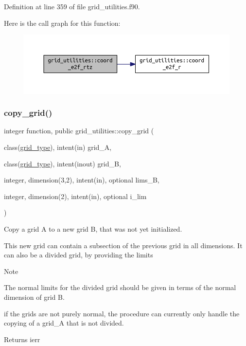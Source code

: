 Definition at line 359 of file grid\+\_\+utilities.\+f90.

Here is the call graph for this function\+:\nopagebreak
\begin{figure}[H]
\begin{center}
\leavevmode
\includegraphics[width=350pt]{namespacegrid__utilities_a2a3c0509679b438d9d5aa5bedfb7a7b8_cgraph}
\end{center}
\end{figure}
\mbox{\label{namespacegrid__utilities_a04f971c38083f873a04eb6568bed466b}} 
\subsubsection{\texorpdfstring{copy\+\_\+grid()}{copy\_grid()}}
{\footnotesize\ttfamily integer function, public grid\+\_\+utilities\+::copy\+\_\+grid (\begin{DoxyParamCaption}\item[{class(\hyperlink{structgrid__vars_1_1grid__type}{grid\+\_\+type}), intent(in)}]{grid\+\_\+A,  }\item[{class(\hyperlink{structgrid__vars_1_1grid__type}{grid\+\_\+type}), intent(inout)}]{grid\+\_\+B,  }\item[{integer, dimension(3,2), intent(in), optional}]{lims\+\_\+B,  }\item[{integer, dimension(2), intent(in), optional}]{i\+\_\+lim }\end{DoxyParamCaption})}



Copy a grid A to a new grid B, that was not yet initialized. 

This new grid can contain a subsection of the previous grid in all dimensions. It can also be a divided grid, by providing the limits

\begin{DoxyNote}{Note}

\begin{DoxyEnumerate}
\item The normal limits for the divided grid should be given in terms of the normal dimension of {\ttfamily grid} B.
\item if the grids are not purely normal, the procedure can currently only handle the copying of a {\ttfamily grid\+\_\+A} that is not divided.
\end{DoxyEnumerate}
\end{DoxyNote}
\begin{DoxyReturn}{Returns}
ierr
\end{DoxyReturn}

